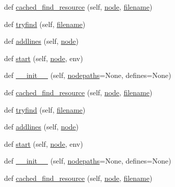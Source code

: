 \begin{DoxyCompactItemize}
\item 
def \hyperlink{classwaflib_1_1_tools_1_1c__preproc_1_1c__parser_a05773b7fed7398fc94fb3393dca8b641}{cached\+\_\+find\+\_\+resource} (self, \hyperlink{structnode}{node}, \hyperlink{test__portburn_8cpp_a7efa5e9c7494c7d4586359300221aa5d}{filename})
\item 
def \hyperlink{classwaflib_1_1_tools_1_1c__preproc_1_1c__parser_a7cbdc05f2fac61f5b962f558d18bf7ab}{tryfind} (self, \hyperlink{test__portburn_8cpp_a7efa5e9c7494c7d4586359300221aa5d}{filename})
\item 
def \hyperlink{classwaflib_1_1_tools_1_1c__preproc_1_1c__parser_a9a0cb675b91f0ce6d65109e1b67bcc69}{addlines} (self, \hyperlink{structnode}{node})
\item 
def \hyperlink{classwaflib_1_1_tools_1_1c__preproc_1_1c__parser_ada08ffe0c9d9fcf8d55b3e35927511e6}{start} (self, \hyperlink{structnode}{node}, env)
\item 
def \hyperlink{classwaflib_1_1_tools_1_1c__preproc_1_1c__parser_aa06a68f192a6f93ba1587fa653d57eaa}{\+\_\+\+\_\+init\+\_\+\+\_\+} (self, \hyperlink{classwaflib_1_1_tools_1_1c__preproc_1_1c__parser_a175b9d997a489166cdfbff084ded4adf}{nodepaths}=None, defines=None)
\item 
def \hyperlink{classwaflib_1_1_tools_1_1c__preproc_1_1c__parser_a05773b7fed7398fc94fb3393dca8b641}{cached\+\_\+find\+\_\+resource} (self, \hyperlink{structnode}{node}, \hyperlink{test__portburn_8cpp_a7efa5e9c7494c7d4586359300221aa5d}{filename})
\item 
def \hyperlink{classwaflib_1_1_tools_1_1c__preproc_1_1c__parser_a7cbdc05f2fac61f5b962f558d18bf7ab}{tryfind} (self, \hyperlink{test__portburn_8cpp_a7efa5e9c7494c7d4586359300221aa5d}{filename})
\item 
def \hyperlink{classwaflib_1_1_tools_1_1c__preproc_1_1c__parser_a9a0cb675b91f0ce6d65109e1b67bcc69}{addlines} (self, \hyperlink{structnode}{node})
\item 
def \hyperlink{classwaflib_1_1_tools_1_1c__preproc_1_1c__parser_ada08ffe0c9d9fcf8d55b3e35927511e6}{start} (self, \hyperlink{structnode}{node}, env)
\item 
def \hyperlink{classwaflib_1_1_tools_1_1c__preproc_1_1c__parser_aa06a68f192a6f93ba1587fa653d57eaa}{\+\_\+\+\_\+init\+\_\+\+\_\+} (self, \hyperlink{classwaflib_1_1_tools_1_1c__preproc_1_1c__parser_a175b9d997a489166cdfbff084ded4adf}{nodepaths}=None, defines=None)
\item 
def \hyperlink{classwaflib_1_1_tools_1_1c__preproc_1_1c__parser_a05773b7fed7398fc94fb3393dca8b641}{cached\+\_\+find\+\_\+resource} (self, \hyperlink{structnode}{node}, \hyperlink{test__portburn_8cpp_a7efa5e9c7494c7d4586359300221aa5d}{filename})

\end{DoxyCompactItemize}
